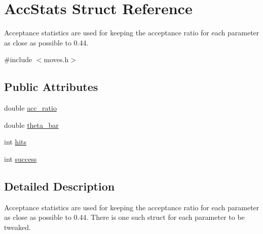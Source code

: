 \hypertarget{structAccStats}{
\section{AccStats Struct Reference}
\label{structAccStats}
}


Acceptance statistics are used for keeping the acceptance ratio for each parameter as close as possible to 0.44.  


{\ttfamily \#include $<$moves.h$>$}\subsection*{Public Attributes}
\begin{DoxyCompactItemize}
\item 
double \hyperlink{structAccStats_a2b39aee6603f5812f840f8da04447c28}{acc\_\-ratio}
\item 
double \hyperlink{structAccStats_ab4014e14e83e9330df034fd58345eb2e}{theta\_\-bar}
\item 
int \hyperlink{structAccStats_abe628be4d47984425dbbb60886d2c89a}{hits}
\item 
int \hyperlink{structAccStats_ad3e93bcadea6e3d1a5060ab63159bc9e}{success}
\end{DoxyCompactItemize}


\subsection{Detailed Description}
Acceptance statistics are used for keeping the acceptance ratio for each parameter as close as possible to 0.44. There is one such struct for each parameter to be tweaked. 

